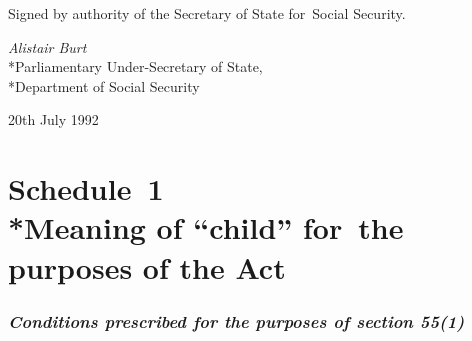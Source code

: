 \documentclass[a4paper,12pt]{article}
\begin{document}
%
%
%
%

\bigskip

Signed by authority of the Secretary of State for~Social Security.

{\raggedleft
\emph{Alistair Burt}\\*Parliamentary Under-Secretary of State,\\*Department of Social Security

}

20th July 1992

\small

\part[Schedule~1 --- Meaning of ``child'' for~the purposes of the Act]{Schedule~1\\*Meaning of ``child'' for~the purposes of the Act}

\renewcommand\parthead{--- Schedule~1}

\section*{\itshape 
Conditions prescribed for the purposes of section 55(1)
}
\end{document}
